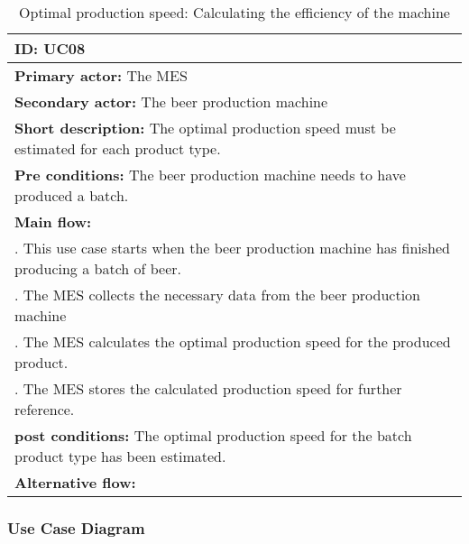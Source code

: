 \begin{table}[ht]
    \begin{tabularx}{\textwidth}{|>{\RaggedRight}X|}
        \hline
        \textbf{ID:} UC08  \\
        \hline
        \textbf{Primary actor:} The MES \\
        \hline
        \textbf{Secondary actor:} The beer production machine \\
        \hline
        \textbf{Short description:} The optimal production speed must be
        estimated for each product type. \\
        \hline
        \textbf{Pre conditions:} The beer production machine needs to have
        produced a batch. \\
        \hline
        \textbf{Main flow:} \\
        	1. This use case starts when the beer production machine has
        	finished producing a batch of beer. \\
			2. The MES collects the necessary data from the beer production
			machine \\
			3. The MES calculates the optimal production speed for the produced
			product. \\
			4. The MES stores the calculated production speed for further
			reference. \\ 
		\hline
        \textbf{post conditions:} The optimal production speed for the batch
        product type has been estimated. \\
        \hline
        \textbf{Alternative flow:} \\
        \hline
    \end{tabularx}
    \caption{Optimal production speed: Calculating the efficiency of the machine}
    \label{table:usecase_productionSpeed}
\end{table}

\subsubsection{Use Case Diagram}
